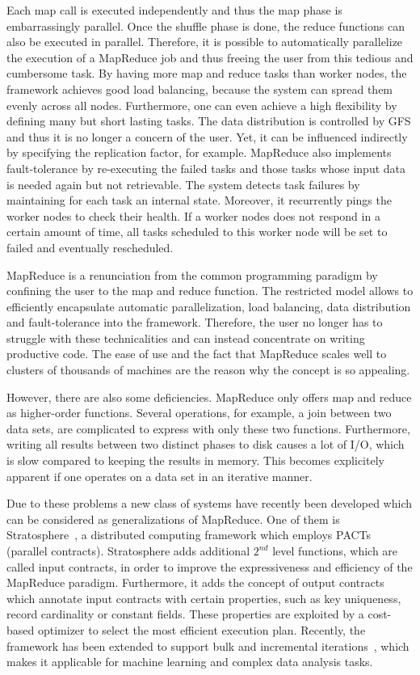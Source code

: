 Each map call is executed independently and thus the map phase is embarrassingly parallel.
Once the shuffle phase is done, the reduce functions can also be executed in parallel.
Therefore, it is possible to automatically parallelize the execution of a MapReduce job and thus freeing the user from this tedious and cumbersome task.
By having more map and reduce tasks than worker nodes, the framework achieves good load balancing, because the system can spread them evenly across all nodes.
Furthermore, one can even achieve a high flexibility by defining many but short lasting tasks.
The data distribution is controlled by GFS and thus it is no longer a concern of the user.
Yet, it can be influenced indirectly by specifying the replication factor, for example.
MapReduce also implements fault-tolerance by re-executing the failed tasks and those tasks whose input data is needed again but not retrievable.
The system detects task failures by maintaining for each task an internal state.
Moreover, it recurrently pings the worker nodes to check their health.
If a worker nodes does not respond in a certain amount of time, all tasks scheduled to this worker node will be set to failed and eventually rescheduled.

MapReduce is a renunciation from the common programming paradigm by confining the user to the map and reduce function.
The restricted model allows \citeauthor{dean:c2008a} to efficiently encapsulate automatic parallelization, load balancing, data distribution and fault-tolerance into the framework.
Therefore, the user no longer has to struggle with these technicalities and can instead concentrate on writing productive code.
The ease of use and the fact that MapReduce scales well to clusters of thousands of machines are the reason why the concept is so appealing.

However, there are also some deficiencies.
MapReduce only offers map and reduce as higher-order functions.
Several operations, for example, a join between two data sets, are complicated to express with only these two functions.
Furthermore, writing all results between two distinct phases to disk causes a lot of I/O, which is slow compared to keeping the results in memory.
This becomes explicitely apparent if one operates on a data set in an iterative manner.

Due to these problems a new class of systems have recently been developed which can be considered as generalizations of MapReduce.
One of them is Stratosphere~\cite{battre:2010a}, a distributed computing framework which employs PACTs~\cite{alexandrov:2011a} (parallel contracts).
Stratosphere adds additional $2^{nd}$ level functions, which are called input contracts, in order to improve the expressiveness and efficiency of the MapReduce paradigm.
Furthermore, it adds the concept of output contracts which annotate input contracts with certain properties, such as key uniqueness, record cardinality or constant fields.
These properties are exploited by a cost-based optimizer to select the most efficient execution plan.
Recently, the framework has been extended to support bulk and incremental iterations~\cite{ewen:pve2012a}, which makes it applicable for machine learning and complex data analysis tasks.

